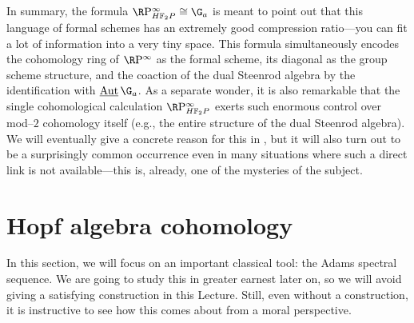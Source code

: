 In summary, the formula \(\RP^\infty_{\HFtwo P} \cong \G_a\) is meant to point out that this language of formal schemes has an extremely good compression ratio---you can fit a lot of information into a very tiny space.  This formula simultaneously encodes the cohomology ring of \(\RP^\infty\) as the formal scheme, its diagonal as the group scheme structure, and the coaction of the dual Steenrod algebra by the identification with \(\InternalAut{\G_a}\).  As a separate wonder, it is also remarkable that the single cohomological calculation \(\RP^\infty_{\HFtwo P}\) exerts such enormous control over mod--\(2\) cohomology itself (e.g., the entire structure of the dual Steenrod algebra).  We will eventually give a concrete reason for this in , but it will also turn out to be a surprisingly common occurrence even in many situations where such a direct link is not available---this is, already, one of the mysteries of the subject.








\section{Hopf algebra cohomology}\label{HopfAlgebraLecture}

In this section, we will focus on an important classical tool: the Adams spectral sequence.  We are going to study this in greater earnest later on, so we will avoid giving a satisfying construction in this Lecture.  Still, even without a construction, it is instructive to see how this comes about from a moral perspective.

